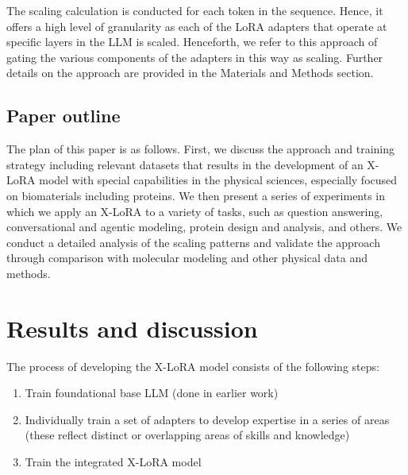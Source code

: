 \documentclass{article}
\begin{document}
The scaling calculation is conducted for each token in the sequence. Hence, it offers a high level of granularity as each of the LoRA adapters that operate at specific layers in the LLM is scaled. 
%
Henceforth, we refer to this approach of gating the various components of the adapters in this way as scaling. Further details on the approach are provided in the Materials and Methods section.

\subsection{Paper outline}

The plan of this paper is as follows. First, we discuss the approach and training strategy including relevant datasets that results in the development of an X-LoRA model with special capabilities in the physical sciences, especially focused on biomaterials including proteins. We then present a series of experiments in which we apply an X-LoRA to a variety of tasks, such as question answering, conversational and agentic modeling, protein design and analysis, and others. We conduct a detailed analysis of the scaling patterns and validate the approach through comparison with molecular modeling and other physical data and methods. 

\section{Results and discussion}

The process of developing the X-LoRA model consists of the following steps:
\begin{enumerate}
    \item Train foundational base LLM (done in earlier work)
    \item Individually train a set of adapters to develop expertise in a series of areas (these reflect distinct or overlapping areas of skills and knowledge)
    \item Train the integrated X-LoRA model
\end{enumerate}
\end{document}
